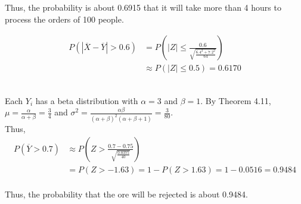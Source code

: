 \documentclass[12pt]{article}
\newenvironment{problem}[2][Problem]{\begin{trivlist}
\item[\hskip \labelsep {\bfseries #1}\hskip \labelsep {\bfseries #2.}]}{\end{trivlist}}
\begin{document}
Thus, the probability is about 0.6915 that it will take more than 4 hours to process the orders of 100 people.

\begin{problem}{7.92}
\end{problem}

\begin{align*}
P(|\overline{X} - \overline{Y}| > 0.6) &= P(|Z| \leq \frac{0.6}{\sqrt{\frac{6.4^2 + 7.2^2}{64}}})\\
	&\approx P(|Z| \leq 0.5) = 0.6170
\end{align*}\\

\begin{problem}{7.96}
\end{problem}

Each $Y_i$ has a beta distribution with $\alpha = 3$ and $\beta = 1$. By Theorem 4.11, $\mu = \frac{\alpha}{\alpha + \beta} = \frac{3}{4}$ and $\sigma^2 = \frac{\alpha\beta}{(\alpha + \beta)^2(\alpha + \beta + 1)} = \frac{3}{80}$.\\
Thus,\\
\begin{align*}
P(\overline{Y} > 0.7) &\approx P(Z > \frac{0.7 - 0.75}{\sqrt{\frac{0.0375}{40}}})\\
	&= P(Z > -1.63) = 1 - P(Z > 1.63) = 1 - 0.0516 = 0.9484
\end{align*}\\
Thus, the probability that the ore will be rejected is about 0.9484.
\end{document}
